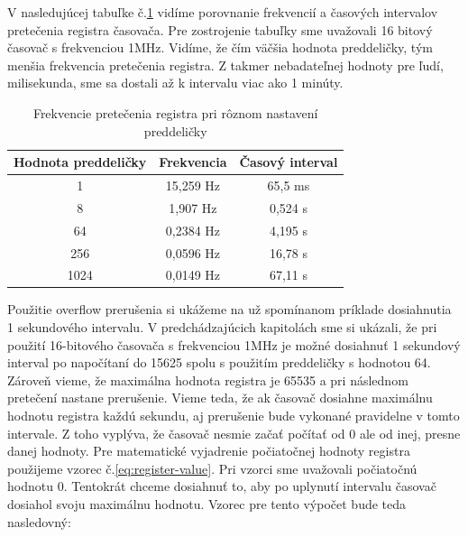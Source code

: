 V nasledujúcej tabuľke č.\ref{table:overflow-frequency} vidíme porovnanie frekvencií a časových intervalov pretečenia registra časovača. Pre zostrojenie tabuľky sme uvažovali 16 bitový časovač
s frekvenciou 1MHz.  Vidíme, že čím väčšia hodnota preddeličky, tým menšia frekvencia
pretečenia registra. Z takmer nebadateľnej hodnoty pre ľudí, milisekunda, sme sa dostali až k intervalu viac ako 1 minúty.

\begin{table}[!htbp]
    \begin{center}
        \begin{tabular}{|c|c|c|}
            \hline
            Hodnota preddeličky & Frekvencia & Časový interval \\
            \hline
            1                   & 15,259 Hz  & 65,5 ms         \\
            8                   & 1,907 Hz   & 0,524 s         \\
            64                  & 0,2384 Hz  & 4,195 s         \\
            256                 & 0,0596 Hz  & 16,78 s         \\
            1024                & 0,0149 Hz  & 67,11 s         \\
            \hline
        \end{tabular}
        \caption{Frekvencie pretečenia registra pri rôznom nastavení preddeličky}
        \label{table:overflow-frequency}
    \end{center}
\end{table}

Použitie overflow prerušenia si ukážeme na už spomínanom príklade dosiahnutia 1 sekundového intervalu. V predchádzajúcich kapitolách sme si ukázali,
že pri použití 16-bitového časovača s frekvenciou 1MHz je možné dosiahnuť 1 sekundový interval po napočítaní do 15625 spolu s použitím preddeličky s hodnotou 64.
Zároveň vieme, že maximálna hodnota registra je 65535 a pri následnom pretečení nastane prerušenie. Vieme teda, že ak časovač dosiahne maximálnu hodnotu registra každú
sekundu, aj prerušenie bude vykonané pravidelne v tomto intervale. Z toho vyplýva, že časovač nesmie začať počítať od 0 ale od inej, presne danej hodnoty.
Pre matematické vyjadrenie počiatočnej hodnoty registra použijeme vzorec č.\ref{eq:register-value}. Pri vzorci sme uvažovali počiatočnú hodnotu 0. Tentokrát chceme
dosiahnuť to, aby po uplynutí intervalu časovač dosiahol svoju maximálnu hodnotu. Vzorec pre tento výpočet bude teda nasledovný:

